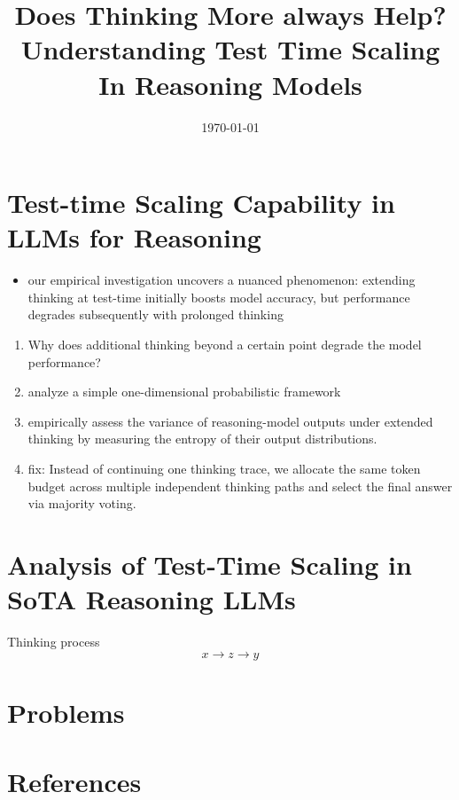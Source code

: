 \documentclass[11pt]{article}
\date{\today}
\title{Does Thinking More always Help? Understanding Test Time Scaling In Reasoning Models}
\begin{document}
\maketitle
\section{Test-time Scaling Capability in LLMs for Reasoning}
\label{sec:orgec5a8aa}
\begin{itemize}
\item our empirical investigation uncovers a nuanced phenomenon: extending thinking at test-time initially
boosts model accuracy, but performance degrades subsequently with prolonged thinking
\end{itemize}


\begin{enumerate}
\item Why does additional thinking beyond a certain point degrade the model performance?
\item analyze a simple one-dimensional probabilistic framework
\item empirically assess the variance of reasoning-model outputs under extended thinking by measuring the
entropy of their output distributions.
\item fix: Instead of continuing one thinking trace, we allocate the same token budget across multiple
independent thinking paths and select the final answer via majority voting.
\end{enumerate}
\section{Analysis of Test-Time Scaling in SoTA Reasoning LLMs}
\label{sec:org43fcad3}
Thinking process
\begin{equation*}
x\to z\to y
\end{equation*}
\section{Problems}
\label{sec:orgf18553a}


\section{References}
\label{sec:orgdb76a60}
\label{bibliographystyle link}



\end{document}

